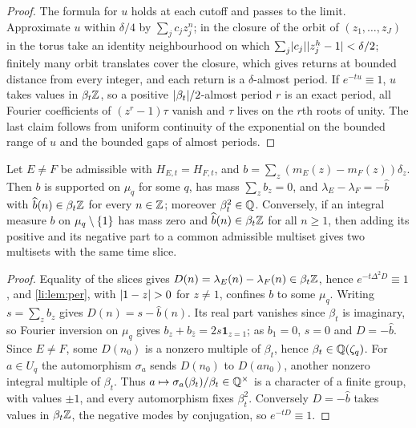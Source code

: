 \begin{proof}
The formula for $u$ holds at each cutoff and passes to the limit. Approximate $u$ within $\delta/4$ by
$\sum_jc_jz_j^n$; in the closure of the orbit of $(z_1,\dots,z_J)$ in the torus take an identity neighbourhood on
which $\sum_j\lvert c_j\rvert\lvert z_j^h-1\rvert<\delta/2$; finitely many orbit translates cover the closure, which gives returns at
bounded distance from every integer, and each return is a $\delta$-almost period. If $e^{-tu}\equiv1$, $u$ takes values
in $\beta_t\mathbb{Z}$, so a positive $\lvert\beta_t\rvert/2$-almost period $r$ is an exact period, all Fourier coefficients
of $(z^r-1)\tau$ vanish and $\tau$ lives on the $r$th roots of unity. The last claim follows from uniform continuity
of the exponential on the bounded range of $u$ and the bounded gaps of almost periods.
\end{proof}

\begin{lemma}\label{li:lem:torsion}
Let $E\ne F$ be admissible with $H_{E,t}=H_{F,t}$, and $b=\sum_z(m_E(z)-m_F(z))\delta_z$. Then $b$ is supported on
$\mu_q$ for some $q$, has mass $\sum_zb_z=0$, and $\lambda_E-\lambda_F=-\widehat b$ with $\widehat b(n)\in\beta_t\mathbb{Z}$ for every
$n\in\mathbb{Z}$; moreover $\beta_t^2\in\mathbb{Q}$. Conversely, if an integral measure $b$ on $\mu_q\setminus\{1\}$ has mass zero and
$\widehat b(n)\in\beta_t\mathbb{Z}$ for all $n\ge1$, then adding its positive and its negative part to a common admissible
multiset gives two multisets with the same time slice.
\end{lemma}

\begin{proof}
Equality of the slices gives $D(n)=\lambda_E(n)-\lambda_F(n)\in\beta_t\mathbb{Z}$, hence $e^{-t\Delta^2D}\equiv1$, and
\cref{li:lem:per}, with $\lvert1-z\rvert>0$ for $z\ne1$, confines $b$ to some $\mu_q$. Writing $s=\sum_zb_z$ gives
$D(n)=s-\widehat b(n)$. Its real part vanishes since $\beta_t$ is imaginary, so Fourier inversion on $\mu_q$ gives
$b_z+b_{\bar z}=2s\mathbf 1_{z=1}$; as $b_1=0$, $s=0$ and $D=-\widehat b$. Since $E\ne F$, some $D(n_0)$ is a nonzero
multiple of $\beta_t$, hence $\beta_t\in\mathbb{Q}(\zeta_q)$. For $a\in U_q$ the automorphism $\sigma_a$ sends $D(n_0)$ to $D(an_0)$,
another nonzero integral multiple of $\beta_t$. Thus $a\mapsto\sigma_a(\beta_t)/\beta_t\in\mathbb{Q}^\times$ is a character of a finite
group, with values $\pm1$, and every automorphism fixes $\beta_t^2$. Conversely $D=-\widehat b$ takes values in $\beta_t\mathbb{Z}$,
the negative modes by conjugation, so $e^{-tD}\equiv1$.
\end{proof}

